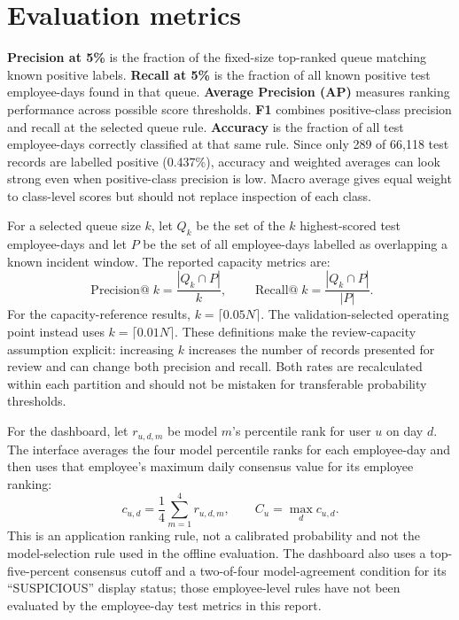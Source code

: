 \documentclass[12pt,a4paper,oneside]{report}
\begin{document}
\section{Evaluation metrics}
\textbf{Precision at 5\%} is the fraction of the fixed-size top-ranked
queue matching known positive labels. \textbf{Recall at 5\%} is the
fraction of all known positive test employee-days found in that queue.
\textbf{Average Precision (AP)} measures ranking performance across
possible score thresholds. \textbf{F1} combines positive-class precision
and recall at the selected queue rule. \textbf{Accuracy} is the fraction
of all test employee-days correctly classified at that same rule. Since
only 289 of 66,118 test records are labelled positive (0.437\%), accuracy
and weighted averages can look strong even when positive-class
precision is low. Macro average gives equal weight to class-level scores
but should not replace inspection of each class.

For a selected queue size \(k\), let \(Q_k\) be the set of the \(k\)
highest-scored test employee-days and let \(P\) be the set of all
employee-days labelled as overlapping a known incident window. The
reported capacity metrics are:
\[
\operatorname{Precision@}k = \frac{|Q_k \cap P|}{k},
\qquad
\operatorname{Recall@}k = \frac{|Q_k \cap P|}{|P|}.
\]
For the capacity-reference results, \(k=\lceil 0.05N\rceil\). The
validation-selected operating point instead uses \(k=\lceil 0.01N\rceil\).
These definitions make the review-capacity assumption explicit:
increasing \(k\) increases the number of records presented for review
and can change both precision and recall. Both rates are recalculated
within each partition and should not be mistaken for transferable
probability thresholds.

For the dashboard, let \(r_{u,d,m}\) be model \(m\)'s percentile rank
for user \(u\) on day \(d\). The interface averages the four model
percentile ranks for each employee-day and then uses that employee's
maximum daily consensus value for its employee ranking:
\[
c_{u,d} = \frac{1}{4}\sum_{m=1}^{4} r_{u,d,m},
\qquad
C_u = \max_d c_{u,d}.
\]
This is an application ranking rule, not a calibrated probability and
not the model-selection rule used in the offline evaluation. The
dashboard also uses a top-five-percent consensus cutoff and a
two-of-four model-agreement condition for its ``SUSPICIOUS'' display
status; those employee-level rules have not been evaluated by the
employee-day test metrics in this report.
\end{document}
